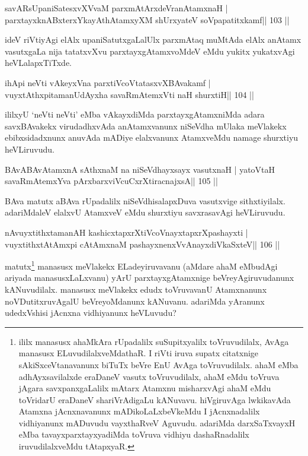 \begin{shl}
savARsUpaniSatesxvXVvaM parxmAtArxdeVranAtamxnaH |
parxtayxknABxterxYkayAthAtamxyXM shUrxyateV soVpapatitxkamf\hfill || 103 ||
\end{shl}

\begin{artha}
ideV riVtiyAgi elAlx upaniSatutxgaLalUlx parxmAtaq muMtAda elAlx anAtamx
vasutxgaLa nija tatatxvXvu parxtayxgAtamxvoMdeV eMdu yukitx yukatxvAgi heVLalapxTiTxde.
\end{artha}

\begin{shl}
ihApi neVti vAkeyxVna parxtiVcoV\s tatasxvXBAvakamf |
vuyxtAthxpitamanUdAyx\s\s ha savaRmAtemxVti naH shurxtiH\hfill || 104 ||
\end{shl}

\begin{artha}
ililxyU `neVti neVti' eMba vAkayxdiMda parxtayxgAtamxniMda adara savxBAvakekx virudadhxvAda anAtamxvanunx niSeVdha mUlaka meVlakekx ebibxsidadxnunx anuvAda mADiye elalxvanunx AtamxveMdu namage shurxtiyu heVLiruvudu.
\end{artha}


\begin{shl}
BAvABAvAtamxnA sAthxnaM na niSeVdhayxsayx vasutxnaH |
yatoV\s taH savaRmAtemxYva pArxbarxviVcuCxrXtiracnajxsA\hfill || 105 ||
\end{shl}

\begin{artha}
BAva matutx aBAva rUpadalilx niSeVdhisalapxDuva vasutxvige sithxtiyilalx. adariMdaleV elalxvU AtamxveV eMdu shurxtiyu savxrasavAgi heVLiruvudu.
\end{artha}

\begin{shl}
nAvuyxtithxtamanAH kashicxtapxrXtiVcoV\s nayxtapxrXpashayxti |
vuyxtithxtAtAmx\s pi cA\s\s tAmxnaM pashayxnenxVvAnayxdiVkaSxteV\hfill || 106 ||
\end{shl}

\begin{artha}
matutx\footnote{ililx manasusx ahaMkAra rUpadalilx suSupitxyalilx
  toVruvudilalx, AvAga manasusx ELuvudilalxveMdathaR. I riVti iruva
  supatx citatxnige sAkiSxceVtanavanunx biTuTx beVre EnU
  AvAga toVruvudilalx. ahaM eMba adhAyxsavilalxde eraDaneV vasutx
  toVruvudilalx, ahaM eMdu toVruva jAgara savxpanxgaLalilx mAtarx
  Atamxnu misharxvAgi ahaM eMdu toVridarU eraDaneV shariVrAdigaLu
  kANuvavu. hiVgiruvAga lwkikavAda Atamxna jAcnxnavanunx
  mADikoLaLxbeVkeMdu I jAcnxnadalilx vidhiyanunx mADuvudu vayxthaRveV
  Aguvudu. adariMda darxSaTxvayxH eMba tavayxparxtayxyadiMda toVruva
  vidhiyu dashaRnadalilx iruvudilalxveMdu tAtapxyaR.} manasusx 
  meVlakekx ELadeyiruvavanu (aMdare ahaM eMbudAgi ariyada 
  manasusxLaLxvanu) yArU parxtayxgAtamxnige 
beVreyAgiruvudanunx kANuvudilalx. manasusx meVlakekx edudx toVruvavanU
Atamxnanunx noVDutitxruvAgalU beVreyoMdanunx kANuvanu. adariMda
yAranunx udedxVshisi jAcnxna vidhiyanunx heVLuvudu?
\end{artha}

